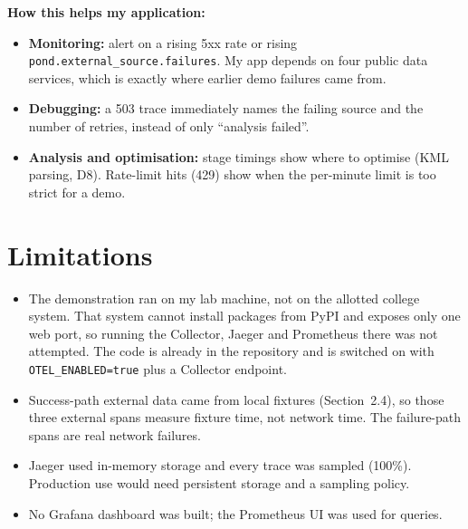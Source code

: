 \documentclass[10.5pt,a4paper]{article}
\begin{document}
\textbf{How this helps my application:}
\begin{itemize}
\item \textbf{Monitoring:} alert on a rising 5xx rate or rising \texttt{pond.external\_source.failures}. My app depends on four public data services, which is exactly where earlier demo failures came from.
\item \textbf{Debugging:} a 503 trace immediately names the failing source and the number of retries, instead of only ``analysis failed''.
\item \textbf{Analysis and optimisation:} stage timings show where to optimise (KML parsing, D8). Rate-limit hits (429) show when the per-minute limit is too strict for a demo.
\end{itemize}

\section{Limitations}
\begin{itemize}
\item The demonstration ran on my lab machine, not on the allotted college system. That system cannot install packages from PyPI and exposes only one web port, so running the Collector, Jaeger and Prometheus there was not attempted. The code is already in the repository and is switched on with \texttt{OTEL\_ENABLED=true} plus a Collector endpoint.
\item Success-path external data came from local fixtures (Section~2.4), so those three external spans measure fixture time, not network time. The failure-path spans are real network failures.
\item Jaeger used in-memory storage and every trace was sampled (100\%). Production use would need persistent storage and a sampling policy.
\item No Grafana dashboard was built; the Prometheus UI was used for queries.
\end{itemize}
\end{document}
